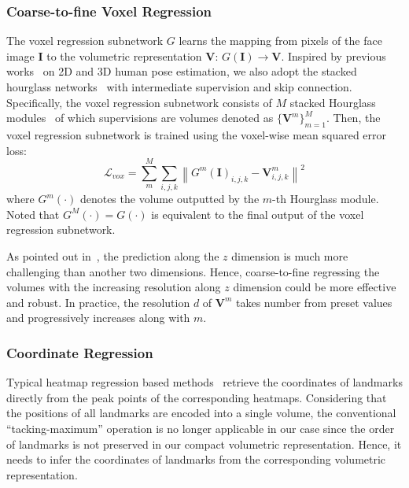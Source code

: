 \documentclass[a4paper,conference]{IEEEtran}
\begin{document}
\subsubsection{Coarse-to-fine Voxel Regression}
The voxel regression subnetwork $G$ learns the mapping from pixels of the face image $\mathbf{I}$ to the volumetric representation $\mathbf{V}$: 
$G(\mathbf{I})\rightarrow \mathbf{V}$.
Inspired by previous works~\cite{newell2016stacked,pavlakos2017coarse} on 2D and 3D human pose estimation, we also adopt the stacked hourglass networks~\cite{newell2016stacked} with intermediate supervision and skip connection.
Specifically, the voxel regression subnetwork consists of $M$ stacked Hourglass modules~\cite{newell2016stacked} of which supervisions are volumes denoted as $\{\mathbf{V}^m\}_{m=1}^M$.
Then, the voxel regression subnetwork is trained using the voxel-wise mean squared error loss:
\begin{equation}
\mathcal{L}_{vox} =\sum\limits_{m}^{M}{\sum\limits_{i,j,k}{{{\left\| {{G}^{m}}{{(\mathbf{I})}_{i,j,k}}-\mathbf{V}^{m}_{i,j,k} \right\|}^{2}}}}
\end{equation}
where $G^m(\cdot)$ denotes the volume outputted by the $m$-th Hourglass module. Noted that $G^M(\cdot)=G(\cdot)$ is equivalent to the final output of the voxel regression subnetwork.

As pointed out in~\cite{pavlakos2017coarse}, the prediction along the $z$ dimension is much more challenging than another two dimensions.
Hence, coarse-to-fine regressing the volumes with the increasing resolution along $z$ dimension could be more effective and robust.
In practice, the resolution $d$ of $\mathbf{V}^m$ takes number from preset values and progressively increases along with $m$.


\subsubsection{Coordinate Regression}

Typical heatmap regression based methods~\cite{bulat2016convolutional,wei2016convolutional,newell2016stacked} retrieve the coordinates of landmarks directly from the peak points of the corresponding heatmaps.
Considering that the positions of all landmarks are encoded into a single volume, the conventional ``tacking-maximum'' operation is no longer applicable in our case since the order of landmarks is not preserved in our compact volumetric representation. 
Hence, it needs to infer the coordinates of landmarks from the corresponding volumetric representation.
\end{document}
